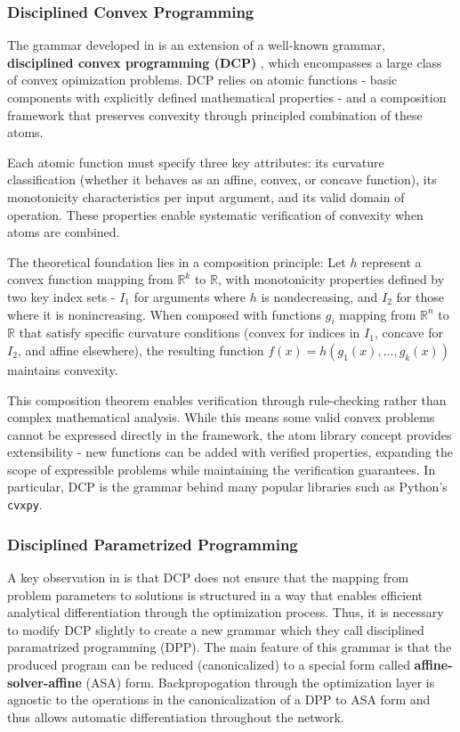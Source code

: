\documentclass{article}
\begin{document}
\subsubsection{Disciplined Convex Programming}
The grammar developed in \citet{differentiabilitysolutionconvexoptimization} is an extension of a well-known grammar, \textbf{disciplined convex programming (DCP)} \citet{dcp}, which encompasses a large class of convex opimization problems. DCP relies on atomic functions - basic components with explicitly defined mathematical properties - and a composition framework that preserves convexity through principled combination of these atoms.

Each atomic function must specify three key attributes: its curvature classification (whether it behaves as an affine, convex, or concave function), its monotonicity characteristics per input argument, and its valid domain of operation. These properties enable systematic verification of convexity when atoms are combined.

The theoretical foundation lies in a composition principle: Let $h$ represent a convex function mapping from $\mathbb{R}^k$ to $\mathbb{R}$, with monotonicity properties defined by two key index sets - $I_1$ for arguments where $h$ is nondecreasing, and $I_2$ for those where it is nonincreasing. When composed with functions $g_i$ mapping from $\mathbb{R}^n$ to $\mathbb{R}$ that satisfy specific curvature conditions (convex for indices in $I_1$, concave for $I_2$, and affine elsewhere), the resulting function $f(x) = h(g_1(x),...,g_k(x))$ maintains convexity.

This composition theorem enables verification through rule-checking rather than complex mathematical analysis. While this means some valid convex problems cannot be expressed directly in the framework, the atom library concept provides extensibility - new functions can be added with verified properties, expanding the scope of expressible problems while maintaining the verification guarantees. In particular, DCP is the grammar behind many popular libraries such as Python's \texttt{cvxpy}.

\subsubsection{Disciplined Parametrized Programming}

A key observation in \citet{differentiableconvexoptimizationlayers} is that DCP does not ensure that the mapping from problem parameters to solutions is structured in a way that enables efficient analytical differentiation through the optimization process. Thus, it is necessary to modify DCP slightly to create a new grammar which they call disciplined paramatrized programming (DPP). The main feature of this grammar is that the produced program can be reduced (canonicalized) to a special form called \textbf{affine-solver-affine} (ASA) form. Backpropogation through the optimization layer is agnostic to the operations in the canonicalization of a DPP to ASA form and thus allows automatic differentiation throughout the network. 
\end{document}
